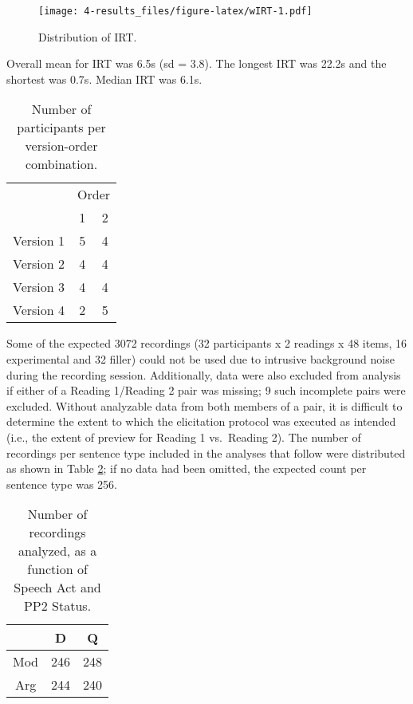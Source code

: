 \documentclass[11pt,oneside]{book}
\begin{document}
\begin{figure}
\centering
\texttt{[image: 4-results\_files/figure-latex/wIRT-1.pdf]}
\caption{\label{fig:wIRT}Distribution of IRT.}
\end{figure}

Overall mean for IRT was 6.5s (sd = 3.8). The longest IRT was 22.2s and the shortest was 0.7s. Median IRT was 6.1s.

\begin{table}[!h]

\caption{\label{tab:vtab}Number of participants per version-order combination.}
\centering
\begin{tabular}{lcc}
\toprule
\multicolumn{1}{c}{ } & \multicolumn{2}{c}{Order} \\
\cmidrule(l{3pt}r{3pt}){2-3}
  & 1 & 2\\
\midrule
Version 1 & 5 & 4\\
Version 2 & 4 & 4\\
Version 3 & 4 & 4\\
Version 4 & 2 & 5\\
\bottomrule
\end{tabular}
\end{table}

Some of the expected 3072 recordings (32 participants x 2 readings x 48 items, 16 experimental and 32 filler) could not be used due to intrusive background noise during the recording session. Additionally, data were also excluded from analysis if either of a Reading 1/Reading 2 pair was missing; 9 such incomplete pairs were excluded. Without analyzable data from both members of a pair, it is difficult to determine the extent to which the elicitation protocol was executed as intended (i.e., the extent of preview for Reading 1 vs.~Reading 2). The number of recordings per sentence type included in the analyses that follow were distributed as shown in Table \ref{tab:rvtab}; if no data had been omitted, the expected count per sentence type was 256.

\begin{table}[!h]

\caption{\label{tab:rvtab}Number of recordings analyzed, as a function of Speech Act and PP2 Status.}
\centering
\begin{tabular}{ccc}
\toprule
  & D & Q\\
\midrule
Mod & 246 & 248\\
Arg & 244 & 240\\
\bottomrule
\end{tabular}
\end{table}
\end{document}
